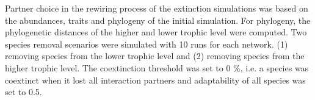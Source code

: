 \documentclass[12pt,a4paper]{article}
\begin{document}
Partner choice in the rewiring process of the extinction simulations was based on the abundances, traits and phylogeny of the initial simulation. For phylogeny, the phylogenetic distances of the higher and lower trophic level were computed. Two species removal scenarios were simulated with 10 runs for each network. (1) removing species from the lower trophic level and (2) removing species from the higher trophic level. The coextinction threshold was set to 0 \%, i.e. a species was coextinct when it lost all interaction partners and adaptability of all species was set to 0.5.
\end{document}
